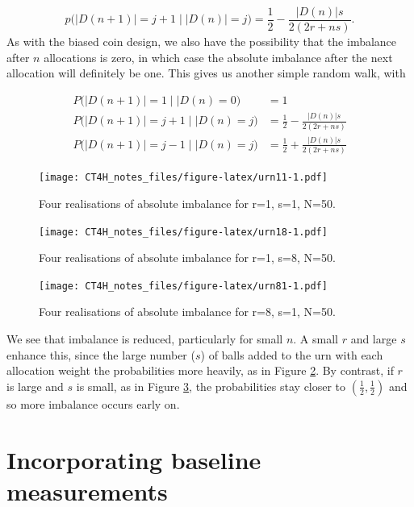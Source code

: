 \documentclass[
  openany]{book}
\theoremstyle{definition}
\theoremstyle{definition}
\theoremstyle{definition}
\theoremstyle{definition}
\theoremstyle{remark}
\begin{document}
\[p\big(\lvert D\left(n+1\right) \rvert = j+1 \mid \lvert D\left(n\right) \rvert = j \big) = \frac{1}{2}  - \frac{\lvert D\left(n\right)\rvert s}{2\left(2r + ns\right)}. \]
As with the biased coin design, we also have the possibility that the imbalance after \(n\) allocations is zero, in which case the absolute imbalance after the next allocation will definitely be one. This gives us another simple random walk, with

\[
  \begin{aligned}
P\big(\lvert D\left(n+1\right) \rvert = 1 \mid \lvert D\left(n\right)=0\big)& = 1\\
P\big(\lvert D\left(n+1\right) \rvert = j+ 1 \mid \lvert D\left(n\right)=j\big)& = \frac{1}{2}  - \frac{\lvert D\left(n\right)\rvert s}{2\left(2r + ns\right)}\\
P\big(\lvert D\left(n+1\right) \rvert = j-1 \mid \lvert D\left(n\right)=j\big)& = \frac{1}{2}  + \frac{\lvert D\left(n\right)\rvert s}{2\left(2r + ns\right)}
\end{aligned}
\]

\begin{figure}
\centering
\texttt{[image: CT4H\_notes\_files/figure-latex/urn11-1.pdf]}
\caption{\label{fig:urn11}Four realisations of absolute imbalance for r=1, s=1, N=50.}
\end{figure}

\begin{figure}
\centering
\texttt{[image: CT4H\_notes\_files/figure-latex/urn18-1.pdf]}
\caption{\label{fig:urn18}Four realisations of absolute imbalance for r=1, s=8, N=50.}
\end{figure}

\begin{figure}
\centering
\texttt{[image: CT4H\_notes\_files/figure-latex/urn81-1.pdf]}
\caption{\label{fig:urn81}Four realisations of absolute imbalance for r=8, s=1, N=50.}
\end{figure}

We see that imbalance is reduced, particularly for small \(n\). A small \(r\) and large \(s\) enhance this, since the large number (\(s\)) of balls added to the urn with each allocation weight the probabilities more heavily, as in Figure \ref{fig:urn18}. By contrast, if \(r\) is large and \(s\) is small, as in Figure \ref{fig:urn81}, the probabilities stay closer to \(\left(\frac{1}{2}, \frac{1}{2}\right)\) and so more imbalance occurs early on.

\hypertarget{incorporating-baseline-measurements}{%
\section{Incorporating baseline measurements}\label{incorporating-baseline-measurements}}
\end{document}
